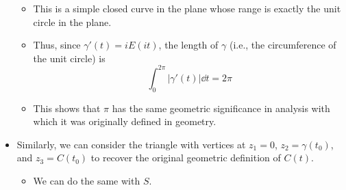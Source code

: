 \documentclass[../notes.tex]{subfiles}
\begin{document}
\begin{itemize}
\begin{itemize}
        \item This is a simple closed curve in the plane whose range is exactly the unit circle in the plane.
        \item Thus, since $\gamma'(t)=iE(it)$, the length of $\gamma$ (i.e., the circumference of the unit circle) is
        \begin{equation*}
            \int_0^{2\pi}|\gamma'(t)|\dd{t} = 2\pi
        \end{equation*}
        \item This shows that $\pi$ has the same geometric significance in analysis with which it was originally defined in geometry.
    \end{itemize}
    \item Similarly, we can consider the triangle with vertices at $z_1=0$, $z_2=\gamma(t_0)$, and $z_3=C(t_0)$ to recover the original geometric definition of $C(t)$.
    \begin{itemize}
        \item We can do the same with $S$.
    \end{itemize}
\end{itemize}
\end{document}
